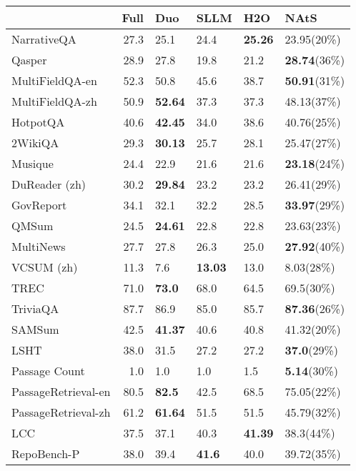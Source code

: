 \begin{tabular}{lrllll}
\toprule
 & Full & Duo & SLLM & H2O & NAtS \\
\midrule
NarrativeQA & 27.3 & 25.1 & 24.4 & \textbf{25.26} & 23.95(20\%) \\
Qasper & 28.9 & 27.8 & 19.8 & 21.2 & \textbf{28.74}(36\%) \\
MultiFieldQA-en & 52.3 & 50.8 & 45.6 & 38.7 & \textbf{50.91}(31\%) \\
MultiFieldQA-zh & 50.9 & \textbf{52.64} & 37.3 & 37.3 & 48.13(37\%) \\
HotpotQA & 40.6 & \textbf{42.45} & 34.0 & 38.6 & 40.76(25\%) \\
2WikiQA & 29.3 & \textbf{30.13} & 25.7 & 28.1 & 25.47(27\%) \\
Musique & 24.4 & 22.9 & 21.6 & 21.6 & \textbf{23.18}(24\%) \\
DuReader (zh) & 30.2 & \textbf{29.84} & 23.2 & 23.2 & 26.41(29\%) \\
GovReport & 34.1 & 32.1 & 32.2 & 28.5 & \textbf{33.97}(29\%) \\
QMSum & 24.5 & \textbf{24.61} & 22.8 & 22.8 & 23.63(23\%) \\
MultiNews & 27.7 & 27.8 & 26.3 & 25.0 & \textbf{27.92}(40\%) \\
VCSUM (zh) & 11.3 & 7.6 & \textbf{13.03} & 13.0 & 8.03(28\%) \\
TREC & 71.0 & \textbf{73.0} & 68.0 & 64.5 & 69.5(30\%) \\
TriviaQA & 87.7 & 86.9 & 85.0 & 85.7 & \textbf{87.36}(26\%) \\
SAMSum & 42.5 & \textbf{41.37} & 40.6 & 40.8 & 41.32(20\%) \\
LSHT & 38.0 & 31.5 & 27.2 & 27.2 & \textbf{37.0}(29\%) \\
Passage Count & 1.0 & 1.0 & 1.0 & 1.5 & \textbf{5.14}(30\%) \\
PassageRetrieval-en & 80.5 & \textbf{82.5} & 42.5 & 68.5 & 75.05(22\%) \\
PassageRetrieval-zh & 61.2 & \textbf{61.64} & 51.5 & 51.5 & 45.79(32\%) \\
LCC & 37.5 & 37.1 & 40.3 & \textbf{41.39} & 38.3(44\%) \\
RepoBench-P & 38.0 & 39.4 & \textbf{41.6} & 40.0 & 39.72(35\%) \\
\bottomrule
\end{tabular}